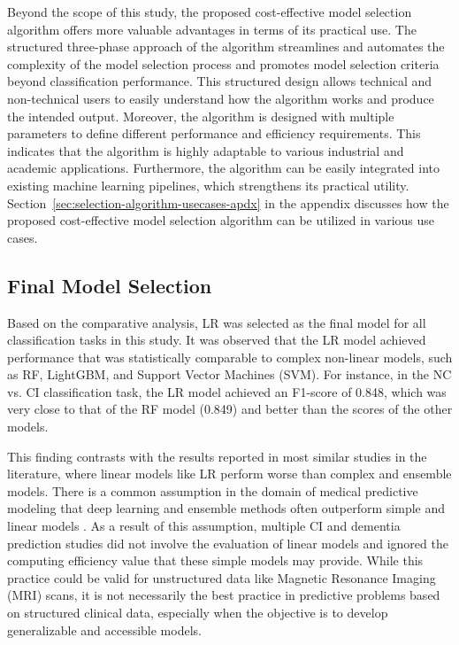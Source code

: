 Beyond the scope of this study, the proposed cost-effective model selection algorithm offers more valuable advantages in terms of its practical use. The structured three-phase approach of the algorithm streamlines and automates the complexity of the model selection process and promotes model selection criteria beyond classification performance. This structured design allows technical and non-technical users to easily understand how the algorithm works and produce the intended output. Moreover, the algorithm is designed with multiple parameters to define different performance and efficiency requirements. This indicates that the algorithm is highly adaptable to various industrial and academic applications. Furthermore, the algorithm can be easily integrated into existing machine learning pipelines, which strengthens its practical utility. Section~\ref{sec:selection-algorithm-usecases-apdx} in the appendix discusses how the proposed cost-effective model selection algorithm can be utilized in various use cases.

\subsection{Final Model Selection}
Based on the comparative analysis, LR was selected as the final model for all classification tasks in this study. It was observed that the LR model achieved performance that was statistically comparable to complex non-linear models, such as RF, LightGBM, and Support Vector Machines (\acrshort{SVM}). For instance, in the NC vs. CI classification task, the LR model achieved an F1-score of 0.848, which was very close to that of the RF model (0.849) and better than the scores of the other models.

This finding contrasts with the results reported in most similar studies in the literature, where linear models like LR perform worse than complex and ensemble models. There is a common assumption in the domain of medical predictive modeling that deep learning and ensemble methods often outperform simple and linear models \cite{Christodoulou2019systematic}. As a result of this assumption, multiple CI and dementia prediction studies did not involve the evaluation of linear models and ignored the computing efficiency value that these simple models may provide. While this practice could be valid for unstructured data like Magnetic Resonance Imaging (\acrshort{MRI}) scans, it is not necessarily the best practice in predictive problems based on structured clinical data, especially when the objective is to develop generalizable and accessible models. 

